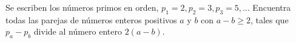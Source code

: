 Se escriben los números primos en orden, $p_1 = 2, p_2 = 3, p_3 = 5,\dots$
Encuentra todas las parejas de números enteros positivos $a$ y $b$ con $a - b \geq 2$, tales que
$p_a - p_b$ divide al número entero $2(a - b)$.